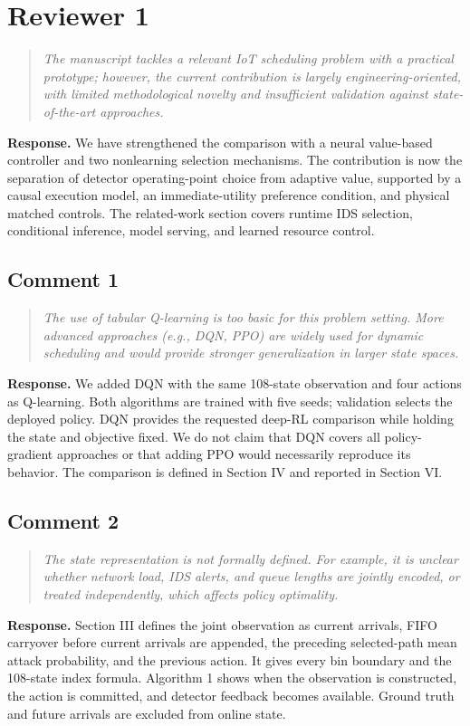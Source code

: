 \documentclass[11pt,a4paper]{article}
\newenvironment{comment}{\begin{quote}\small\itshape}{\end{quote}}
\newcommand{\response}{\noindent\textbf{Response.} }
\begin{document}
\section*{Reviewer 1}
\begin{comment}
The manuscript tackles a relevant IoT scheduling problem with a practical prototype; however, the current contribution is largely engineering-oriented, with limited methodological novelty and insufficient validation against state-of-the-art approaches.
\end{comment}
\response We have strengthened the comparison with a neural value-based controller and two nonlearning selection mechanisms. The contribution is now the separation of detector operating-point choice from adaptive value, supported by a causal execution model, an immediate-utility preference condition, and physical matched controls. The related-work section covers runtime IDS selection, conditional inference, model serving, and learned resource control.

\subsection*{Comment 1}
\begin{comment}
The use of tabular Q-learning is too basic for this problem setting. More advanced approaches (e.g., DQN, PPO) are widely used for dynamic scheduling and would provide stronger generalization in larger state spaces.
\end{comment}
\response We added DQN with the same 108-state observation and four actions as Q-learning. Both algorithms are trained with five seeds; validation selects the deployed policy. DQN provides the requested deep-RL comparison while holding the state and objective fixed. We do not claim that DQN covers all policy-gradient approaches or that adding PPO would necessarily reproduce its behavior. The comparison is defined in Section IV and reported in Section VI.

\subsection*{Comment 2}
\begin{comment}
The state representation is not formally defined. For example, it is unclear whether network load, IDS alerts, and queue lengths are jointly encoded, or treated independently, which affects policy optimality.
\end{comment}
\response Section III defines the joint observation as current arrivals, FIFO carryover before current arrivals are appended, the preceding selected-path mean attack probability, and the previous action. It gives every bin boundary and the 108-state index formula. Algorithm 1 shows when the observation is constructed, the action is committed, and detector feedback becomes available. Ground truth and future arrivals are excluded from online state.
\end{document}
